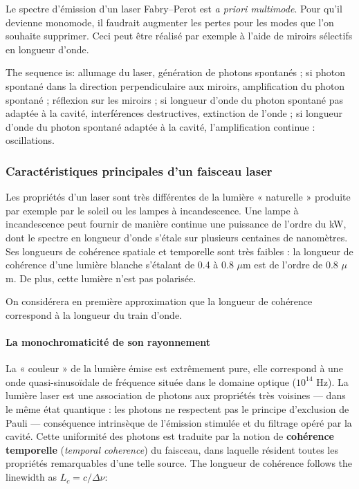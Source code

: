 \begin{remark}
  Le spectre d'émission d'un laser Fabry--Perot est \emph{a priori multimode}.
  Pour qu'il devienne monomode, il faudrait augmenter les pertes pour les modes
  que l'on souhaite supprimer. Ceci peut être réalisé par exemple à l'aide de
  miroirs sélectifs en longueur d'onde.
\end{remark}

\begin{example}
  The sequence is: allumage du laser, génération de photons spontanés ; si
  photon spontané dans la direction perpendiculaire aux miroirs, amplification
  du photon spontané ; réflexion sur les miroirs ; si longueur d'onde du photon
  spontané pas adaptée à la cavité, interférences destructives, extinction de
  l'onde ; si longueur d'onde du photon spontané adaptée à la cavité,
  l'amplification continue : oscillations.
\end{example}

\subsubsection{Caractéristiques principales d'un faisceau laser}
Les propriétés d'un laser sont très différentes de la lumière « naturelle »
produite par exemple par le soleil ou les lampes à incandescence. Une lampe à
incandescence peut fournir de manière continue une puissance de l'ordre du kW,
dont le spectre en longueur d'onde s'étale sur plusieurs centaines de
nanomètres. Ses longueurs de cohérence spatiale et temporelle sont très
faibles : la longueur de cohérence d'une lumière blanche s'étalant de 0.4 à
0.8 $\mu$m est de l'ordre de 0.8 $\mu$m. De plus, cette lumière n'est pas
polarisée.

\begin{remark}
  On considérera en première approximation que la longueur de cohérence
  correspond à la longueur du train d'onde.
\end{remark}

\paragraph{La monochromaticité de son rayonnement}
La « couleur » de la lumière émise est extrêmement pure, elle correspond à une
onde quasi-sinusoïdale de fréquence située dans le domaine optique
($10^{14}$ Hz). La lumière laser est une association de photons aux propriétés
très voisines --- dans le même état quantique : les photons ne respectent pas le
principe d'exclusion de Pauli --- conséquence intrinsèque de l'émission
stimulée et du filtrage opéré par la cavité. Cette uniformité des photons est
traduite par la notion de \textbf{cohérence temporelle} (\textit{temporal
coherence}) du faisceau, dans laquelle résident toutes les propriétés
remarquables d'une telle source. The longueur de cohérence follows the
linewidth as $L_c=c/\Delta\nu$:

